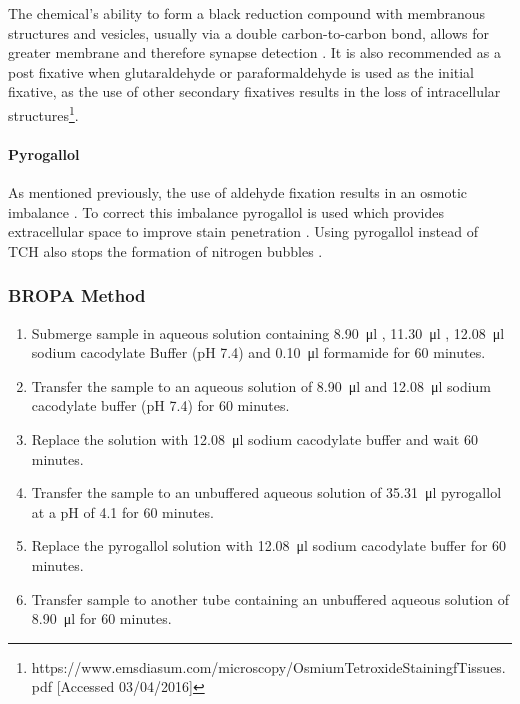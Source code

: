 \documentclass[a4paper, 11pt]{article}
\numberwithin{equation}{section}
\begin{document}
The chemical's ability to form a black reduction compound with membranous structures and vesicles, usually via a double carbon-to-carbon bond, allows for greater membrane and therefore synapse detection \cite{OsmiumTetroxidemethod}. It is also recommended as a post fixative when glutaraldehyde or paraformaldehyde is used as the initial fixative, as the use of other secondary fixatives results in the loss of intracellular structures\footnote{https://www.emsdiasum.com/microscopy/OsmiumTetroxideStainingfTissues.pdf [Accessed 03/04/2016]}.

\paragraph{Pyrogallol}

As mentioned previously, the use of aldehyde fixation results in an osmotic imbalance \cite{Cryoprotectantsoptions}. To correct this imbalance pyrogallol is used which provides extracellular space to improve stain penetration \cite{osmoticimbalance}. Using pyrogallol instead of TCH also stops the formation of nitrogen bubbles \cite{highres_em_staining}.

\subsubsection{BROPA Method \cite{highres_em_staining}}
 	\label{bropa_meth}


\begin{enumerate}
 \item Submerge sample in aqueous solution containing \SI{8.90}{\micro\litre} , \SI{11.30}{\micro\litre} , \SI{12.08}{\micro\litre} sodium cacodylate Buffer (pH 7.4) and \SI{0.10}{\micro\litre} formamide for 60 minutes.
 \item Transfer the sample to an aqueous solution of \SI{8.90}{\micro\litre}  and \SI{12.08}{\micro\litre} sodium cacodylate buffer (pH 7.4) for 60 minutes.
 \item Replace the solution with \SI{12.08}{\micro\litre} sodium cacodylate buffer and wait 60 minutes.
 \item Transfer the sample to an unbuffered aqueous solution of \SI{35.31}{\micro\litre} pyrogallol at a pH of 4.1 for 60 minutes.
 \item Replace the pyrogallol solution with \SI{12.08}{\micro\litre} sodium cacodylate buffer for 60 minutes.
 \item Transfer sample to another tube containing an unbuffered aqueous solution of \SI{8.90}{\micro\litre}  for 60 minutes.
\end{enumerate}
\end{document}
